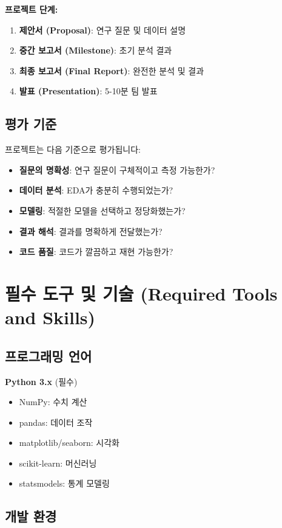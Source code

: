 \documentclass[12pt,a4paper]{article}
\begin{document}
\textbf{프로젝트 단계:}
\begin{enumerate}
    \item \textbf{제안서 (Proposal)}: 연구 질문 및 데이터 설명
    \item \textbf{중간 보고서 (Milestone)}: 초기 분석 결과
    \item \textbf{최종 보고서 (Final Report)}: 완전한 분석 및 결과
    \item \textbf{발표 (Presentation)}: 5-10분 팀 발표
\end{enumerate}

\subsection{평가 기준}

프로젝트는 다음 기준으로 평가됩니다:
\begin{itemize}
    \item \textbf{질문의 명확성}: 연구 질문이 구체적이고 측정 가능한가?
    \item \textbf{데이터 분석}: EDA가 충분히 수행되었는가?
    \item \textbf{모델링}: 적절한 모델을 선택하고 정당화했는가?
    \item \textbf{결과 해석}: 결과를 명확하게 전달했는가?
    \item \textbf{코드 품질}: 코드가 깔끔하고 재현 가능한가?
\end{itemize}

\section{필수 도구 및 기술 (Required Tools and Skills)}

\subsection{프로그래밍 언어}

\textbf{Python 3.x} (필수)
\begin{itemize}
    \item NumPy: 수치 계산
    \item pandas: 데이터 조작
    \item matplotlib/seaborn: 시각화
    \item scikit-learn: 머신러닝
    \item statsmodels: 통계 모델링
\end{itemize}

\subsection{개발 환경}
\end{document}
